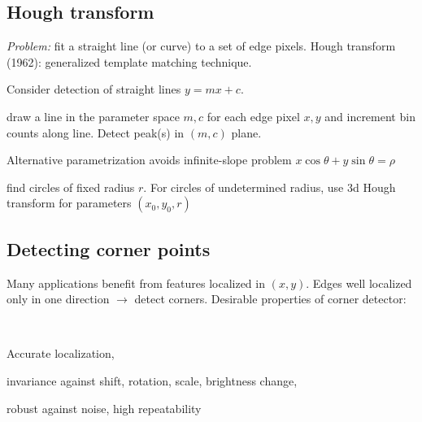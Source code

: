 \subsection{Hough transform}
\emph{Problem:} fit a straight line (or curve) to a set of edge pixels. Hough transform (1962): generalized template matching technique. \\
\begin{enumerate*}[label=\protect\circled{\arabic*},itemjoin=]
	\item Consider detection of straight lines $y=mx+c$.\\
	\item draw a line in the parameter space $m,c$ for each edge pixel $x,y$ and increment bin counts along line. Detect peak(s) in $(m,c)$ plane.\\
	\item Alternative parametrization avoids infinite-slope problem $x\cos\theta+y\sin\theta=\rho$\\
\end{enumerate*}
\begin{compactdesc}
	\item[\lp{circle detection}] find circles of fixed radius $r$. For circles of undetermined radius, use 3d Hough transform for parameters $(x_0,y_0,r)$
\end{compactdesc}
\subsection{Detecting corner points}
Many applications benefit from features localized in $(x,y)$. Edges well localized only in one direction $\to$ detect corners. Desirable properties of corner detector:
\begin{enumerate*}[label=\protect\circled{\arabic*},itemjoin=]\hfill\\
	\item Accurate localization,\\
	\item	invariance against shift, rotation, scale, brightness change,\\ 
	\item robust against noise, high repeatability\\
\end{enumerate*}
